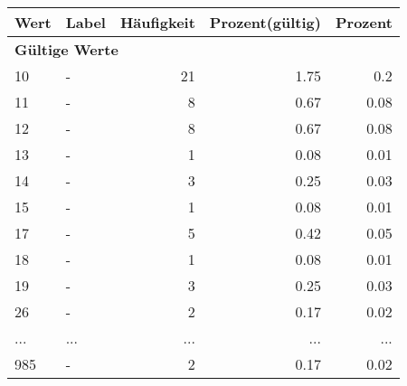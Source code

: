      \begin{longtable}{lXrrr}
     \toprule
     \textbf{Wert} & \textbf{Label} & \textbf{Häufigkeit} & \textbf{Prozent(gültig)} & \textbf{Prozent} \\
     \endhead
     \midrule
     \multicolumn{5}{l}{\textbf{Gültige Werte}}\\
        10 & \multicolumn{1}{X}{-} & %
          \num{21} &
          \num[round-mode=places,round-precision=2]{1,75} &
          \num[round-mode=places,round-precision=2]{0,2} \\
        11 & \multicolumn{1}{X}{-} & %
          \num{8} &
          \num[round-mode=places,round-precision=2]{0,67} &
          \num[round-mode=places,round-precision=2]{0,08} \\
        12 & \multicolumn{1}{X}{-} & %
          \num{8} &
          \num[round-mode=places,round-precision=2]{0,67} &
          \num[round-mode=places,round-precision=2]{0,08} \\
        13 & \multicolumn{1}{X}{-} & %
          \num{1} &
          \num[round-mode=places,round-precision=2]{0,08} &
          \num[round-mode=places,round-precision=2]{0,01} \\
        14 & \multicolumn{1}{X}{-} & %
          \num{3} &
          \num[round-mode=places,round-precision=2]{0,25} &
          \num[round-mode=places,round-precision=2]{0,03} \\
        15 & \multicolumn{1}{X}{-} & %
          \num{1} &
          \num[round-mode=places,round-precision=2]{0,08} &
          \num[round-mode=places,round-precision=2]{0,01} \\
        17 & \multicolumn{1}{X}{-} & %
          \num{5} &
          \num[round-mode=places,round-precision=2]{0,42} &
          \num[round-mode=places,round-precision=2]{0,05} \\
        18 & \multicolumn{1}{X}{-} & %
          \num{1} &
          \num[round-mode=places,round-precision=2]{0,08} &
          \num[round-mode=places,round-precision=2]{0,01} \\
        19 & \multicolumn{1}{X}{-} & %
          \num{3} &
          \num[round-mode=places,round-precision=2]{0,25} &
          \num[round-mode=places,round-precision=2]{0,03} \\
        26 & \multicolumn{1}{X}{-} & %
          \num{2} &
          \num[round-mode=places,round-precision=2]{0,17} &
          \num[round-mode=places,round-precision=2]{0,02} \\
       ... & ... & ... & ... & ... \\
        985 & \multicolumn{1}{X}{-} & %
          \num{2} &
          \num[round-mode=places,round-precision=2]{0,17} &
          \num[round-mode=places,round-precision=2]{0,02} \\


\end{longtable}

